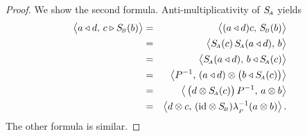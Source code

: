 \begin{proof}
We show the second formula. Anti-multiplicativity of\/ $S_{\scriptscriptstyle \! A}$ yields
\begin{eqnarray*}
       \pairM{a \ract d}{c \lact \SB(b)}
  &=&
       \pairM{(a \ract d)c}{\SB(b)}
\\&=&
       \pairM{\SA(c) \, \SA(a \ract d)}{b}
\\&=&
       \pairM{\SA(a \ract d)}{b \ract \SA(c)}
\\&=&
       \pairM{P^{-1}}{(a \ract d) \tens \left(b \ract \SA(c) \vertM\right)}
\\&=&
       \pairM{\left( d \tens \SA(c) \vertM\right) P^{-1}}{a \tens b}
\\&=&
       \pairM{d \tens c}{(\id \tens \SB)\lp^{-1}(a \tens b)}.
\end{eqnarray*}
The other formula is similar.
\end{proof}




